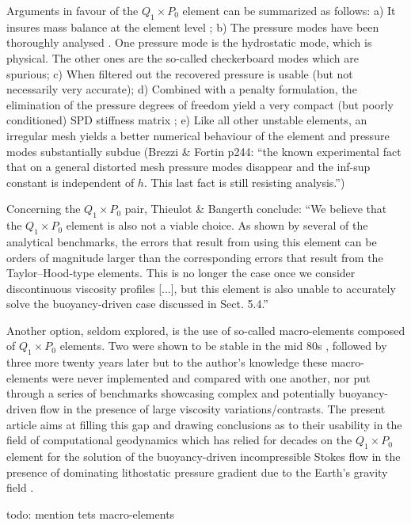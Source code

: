 \documentclass[a4paper,12pt]{article}
\begin{document}
Arguments in favour of the $Q_1\times P_0$ element can be summarized as follows:
a) It insures mass balance at the element level \cite[p459]{grsa};
b) The pressure modes have been thoroughly analysed \cite{sagl81a,sagl81b,grsi94}.
One pressure mode is the hydrostatic mode, which is  
physical. The other ones are the so-called checkerboard modes which are spurious;
c) When filtered out \cite{chpc95} the recovered pressure is usable (but not 
necessarily very accurate);
d) Combined with a penalty formulation, the elimination of the pressure degrees of freedom 
yield a very compact (but poorly conditioned) SPD stiffness matrix \cite{zigo75,hulb79,zina82,redd82,odks82};
e) Like all other unstable elements, an irregular mesh yields a 
better numerical behaviour of the element \cite{qizh07} and pressure modes substantially subdue
(Brezzi \& Fortin p244: ``the known experimental fact that on a general
distorted mesh pressure modes disappear and the inf-sup constant is independent of $h$. 
This last fact is still resisting analysis.'')

Concerning the $Q_1 \times P_0$ pair, Thieulot \& Bangerth \cite{thba22} conclude:
``We believe that the $Q_1 \times P_0$ element is also not a viable
choice. As shown by several of the analytical benchmarks, the errors that result from using this element can
be orders of magnitude larger than the corresponding
errors that result from the Taylor–Hood-type elements.
This is no longer the case once we consider discontinuous viscosity profiles [...], but this element
is also unable to accurately solve the buoyancy-driven
case discussed in Sect. 5.4.''

Another option, seldom explored, is the use of so-called macro-elements composed of $Q_1\times P_0$ elements. 
Two were shown to be stable in the mid 80s \cite{leta81,sten84}, followed by three more twenty years
later\cite{qizh07} but to the author's knowledge these macro-elements were never 
implemented and compared with one another, nor put through a series of benchmarks showcasing 
complex and potentially buoyancy-driven flow in the 
presence of large viscosity variations/contrasts. The present article aims at 
filling this gap and drawing conclusions as to their usability in 
the field of computational geodynamics which has relied for decades on the $Q_1\times P_0$ element for the 
solution of the buoyancy-driven incompressible Stokes flow in the presence of 
dominating lithostatic pressure gradient due to the Earth's gravity field \cite{full95,lumh24}.  

{\color{red} todo: mention tets macro-elements}
\end{document}
